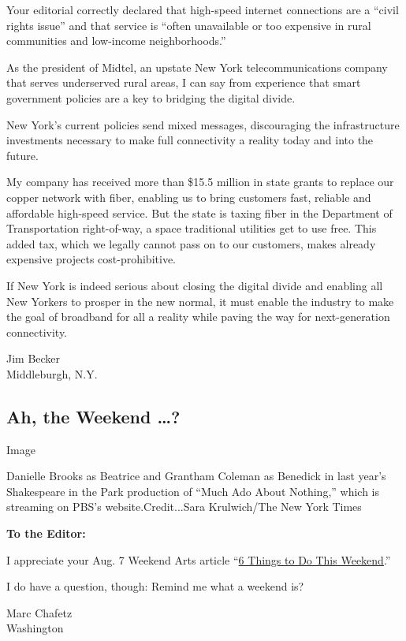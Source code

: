 Your editorial correctly declared that high-speed internet connections
are a ``civil rights issue'' and that service is ``often unavailable or
too expensive in rural communities and low-income neighborhoods.''

As the president of Midtel, an upstate New York telecommunications
company that serves underserved rural areas, I can say from experience
that smart government policies are a key to bridging the digital divide.

New York's current policies send mixed messages, discouraging the
infrastructure investments necessary to make full connectivity a reality
today and into the future.

My company has received more than \$15.5 million in state grants to
replace our copper network with fiber, enabling us to bring customers
fast, reliable and affordable high-speed service. But the state is
taxing fiber in the Department of Transportation right-of-way, a space
traditional utilities get to use free. This added tax, which we legally
cannot pass on to our customers, makes already expensive projects
cost-prohibitive.

If New York is indeed serious about closing the digital divide and
enabling all New Yorkers to prosper in the new normal, it must enable
the industry to make the goal of broadband for all a reality while
paving the way for next-generation connectivity.

Jim Becker\\
Middleburgh, N.Y.

\hypertarget{ah-the-weekend-}{%
\subsection{Ah, the Weekend \ldots?}\label{ah-the-weekend-}}

Image

Danielle Brooks as Beatrice and Grantham Coleman as Benedick in last
year's Shakespeare in the Park production of ``Much Ado About Nothing,''
which is streaming on PBS's website.Credit...Sara Krulwich/The New York
Times

\textbf{To the Editor:}

I appreciate your Aug. 7 Weekend Arts article
``\href{https://www.nytimes.com/2020/08/06/arts/things-to-do-weekend-coronavirus.html?searchResultPosition=1}{6
Things to Do This Weekend}.''

I do have a question, though: Remind me what a weekend is?

Marc Chafetz\\
Washington

